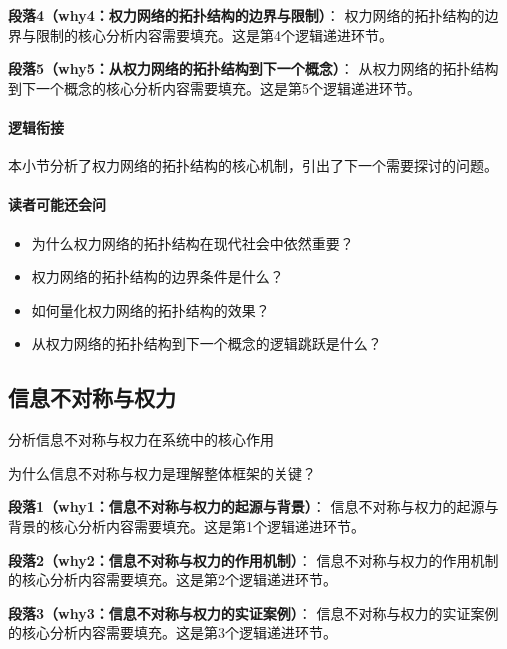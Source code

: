 \documentclass[../main.tex]{subfiles}
\begin{document}
\textbf{段落4（why4：权力网络的拓扑结构的边界与限制）}：
权力网络的拓扑结构的边界与限制的核心分析内容需要填充。这是第4个逻辑递进环节。


\textbf{段落5（why5：从权力网络的拓扑结构到下一个概念）}：
从权力网络的拓扑结构到下一个概念的核心分析内容需要填充。这是第5个逻辑递进环节。


\paragraph*{逻辑衔接}
本小节分析了权力网络的拓扑结构的核心机制，引出了下一个需要探讨的问题。

\paragraph*{读者可能还会问}
\begin{itemize}
\item 为什么权力网络的拓扑结构在现代社会中依然重要？
\item 权力网络的拓扑结构的边界条件是什么？
\item 如何量化权力网络的拓扑结构的效果？
\item 从权力网络的拓扑结构到下一个概念的逻辑跳跃是什么？
\end{itemize}


\subsection{信息不对称与权力}

\begin{motivation}
分析信息不对称与权力在系统中的核心作用
\end{motivation}

\begin{logicmap}
[逻辑链占位]
\end{logicmap}

\begin{questionbox}
为什么信息不对称与权力是理解整体框架的关键？
\end{questionbox}

\textbf{段落1（why1：信息不对称与权力的起源与背景）}：
信息不对称与权力的起源与背景的核心分析内容需要填充。这是第1个逻辑递进环节。


\textbf{段落2（why2：信息不对称与权力的作用机制）}：
信息不对称与权力的作用机制的核心分析内容需要填充。这是第2个逻辑递进环节。


\textbf{段落3（why3：信息不对称与权力的实证案例）}：
信息不对称与权力的实证案例的核心分析内容需要填充。这是第3个逻辑递进环节。
\end{document}
